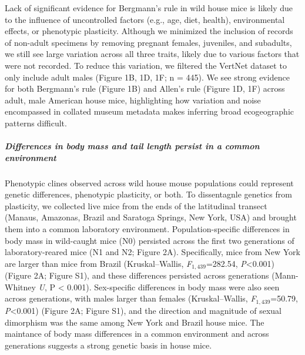 \documentclass[]{article}
\let\oldsubparagraph\subparagraph
\renewcommand{\subparagraph}[1]{\oldsubparagraph{#1}\mbox{}}
\begin{document}
Lack of significant evidence for Bergmann's rule in wild house mice is
likely due to the influence of uncontrolled factors (e.g., age, diet,
health), environmental effects, or phenotypic plasticity. Although we
minimized the inclusion of records of non-adult specimens by removing
pregnant females, juveniles, and subadults, we still see large variation
across all three traits, likely due to various factors that were not
recorded. To reduce this variation, we filtered the VertNet dataset to
only include adult males (Figure 1B, 1D, 1F; n = 445). We see strong
evidence for both Bergmann's rule (Figure 1B) and Allen's rule (Figure
1D, 1F) across adult, male American house mice, highlighting how
variation and noise encompassed in collated museum metadata makes
inferring broad ecogeographic patterns difficult.

\vspace{2.5mm}

\hypertarget{differences-in-body-mass-and-tail-length-persist-in-a-common-environment}{%
\subparagraph{\texorpdfstring{\emph{Differences in body mass and tail
length persist in a common
environment}}{Differences in body mass and tail length persist in a common environment}}\label{differences-in-body-mass-and-tail-length-persist-in-a-common-environment}}

Phenotypic clines observed across wild house mouse populations could
represent genetic differences, phenotypic plasticity, or both. To
dissentagnle genetics from plasticity, we collected live mice from the
ends of the latitudinal transect (Manaus, Amazonas, Brazil and Saratoga
Springs, New York, USA) and brought them into a common laboratory
environment. Population-specific differences in body mass in wild-caught
mice (N0) persisted across the first two generations of
laboratory-reared mice (N1 and N2; Figure 2A). Specifically, mice from
New York are larger than mice from Brazil (Kruskal--Wallis,
\emph{F}\(_{1,439}\)=282.54, \emph{P}\textless{}0.001) (Figure 2A;
Figure S1), and these differences persisted across generations
(Mann-Whitney \emph{U}, P \textless{} 0.001). Sex-specific differences
in body mass were also seen across generations, with males larger than
females (Kruskal--Wallis, \emph{F}\(_{1,439}\)=50.79,
\emph{P}\textless{}0.001) (Figure 2A; Figure S1), and the direction and
magnitude of sexual dimorphism was the same among New York and Brazil
house mice. The maintance of body mass differences in a common
environment and across generations suggests a strong genetic basis in
house mice.
\end{document}
